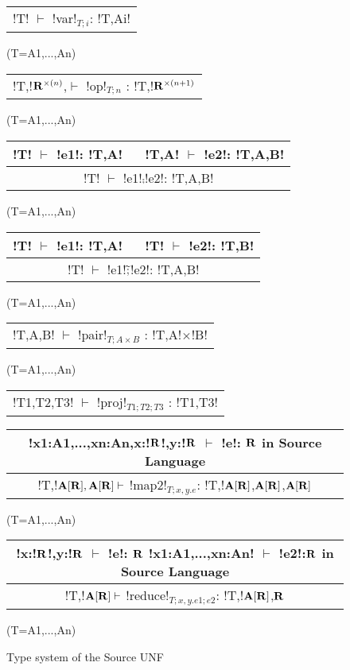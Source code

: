 \begin{figure*}[tb]
    \centering
    \begin{tabular}{c} 
    \\\hline
    !T! $\vdash$ !var!$_{T;i}$: !T,Ai!
    \end{tabular}(T=A1,...,An)
    \hspace{0.5cm}
    \begin{tabular}{c}
        \\\hline
        !T,!$\mathbf{R}^{\times(n)}$,$\vdash$ !op!$_{T;n}$ : !T,!$\mathbf{R}^{\times(n+1)}$
    \end{tabular}(T=A1,...,An)

    \begin{tabular}{c}
    !T! $\vdash$ !e1!: !T,A! $\quad$ !T,A! $\vdash$ !e2!: !T,A,B! \\\hline
    !T! $\vdash$ !e1!$\comp$!e2!: !T,A,B!
    \end{tabular}(T=A1,...,An)
    \hspace{0.5cm}
    \begin{tabular}{c}
        !T! $\vdash$ !e1!: !T,A! $\quad$ !T! $\vdash$ !e2!: !T,B! \\\hline
        !T! $\vdash$ !e1!$\widetilde{;}$!e2!: !T,A,B!
    \end{tabular}(T=A1,...,An)

    \begin{tabular}{c}
        \\\hline
        !T,A,B! $\vdash$ !pair!$_{T;A\times B}$ : !T,A!$\times$!B!
    \end{tabular}(T=A1,...,An)

    \begin{tabular}{c}
        \\\hline
        !T1,T2,T3! $\vdash$ !proj!$_{T1;T2;T3}$ : !T1,T3!
    \end{tabular}

    \begin{tabular}{c}
        !x1:A1,...,xn:An,x:!$\mathbf{R}$!,y:!$\mathbf{R}$ $\vdash$ !e!: $\mathbf{R}$ \quad in Source Language
        \\\hline  
        !T,!$\mathbf{A}[\mathbf{R}],\mathbf{A}[\mathbf{R}] \vdash$ !map2!$_{T; x,y.e}$: !T,!$\mathbf{A}[\mathbf{R}]$,$\mathbf{A}[\mathbf{R}]$,$\mathbf{A}[\mathbf{R}]$
    \end{tabular}(T=A1,...,An)

    \begin{tabular}{c}
        !x:!$\mathbf{R}$!,y:!$\mathbf{R}$ $\vdash$ !e!: $\mathbf{R}$ \quad !x1:A1,...,xn:An! $\vdash$ !e2!:$\mathbf{R}$ \quad in Source Language
        \\\hline  
        !T,!$\mathbf{A}[\mathbf{R}] \vdash$ !reduce!$_{T; x,y.e1; e2}$: !T,!$\mathbf{A}[\mathbf{R}]$,$\mathbf{R}$
    \end{tabular}(T=A1,...,An)
    \vspace{-0.2cm}
    \caption{Type system of the Source UNF}
    \vspace{-0.4cm}
    \label{fig:source_unf_typesystem}
\end{figure*}
